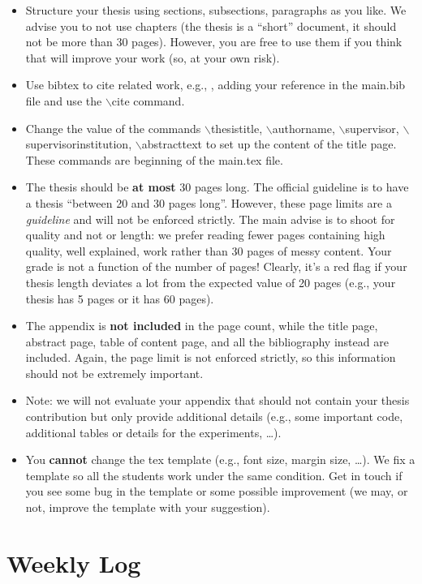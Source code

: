 \documentclass[oneside, a4paper, onecolumn, 11pt]{article}
\begin{document}
\begin{itemize}
\item Structure your thesis using sections, subsections, paragraphs as you like. We advise you to not use chapters (the thesis is a ``short'' document, it should not be more than 30 pages). However, you are free to use them if you think that will improve your work (so, at your own risk).
%
\item Use bibtex to cite related work, e.g., \cite{DBLP:journals/x/Turing37}, adding your reference in the {main.bib} file and use the {$\backslash$cite} command. 
%
\item Change the value of the commands {$\backslash$thesistitle}, {$\backslash$authorname}, {$\backslash$supervisor}, {$\backslash$supervisorinstitution}, {$\backslash$abstracttext} to set up the content of the title page. These commands are beginning of the {main.tex} file.
%
\item The thesis should be \textbf{at most} 30 pages long. The official guideline is to have a thesis ``between 20 and 30 pages long''. However, these page limits are a \emph{guideline} and will not be enforced strictly. 
%
The main advise is to shoot for quality and not or length: we prefer reading fewer pages containing high quality, well explained, work rather than 30 pages of messy content. Your grade is not a function of the number of pages!
%
Clearly, it's a red flag if your thesis length deviates a lot from the expected value of 20 pages (e.g., your thesis has 5 pages or it has 60 pages).
%
\item The appendix is \textbf{not included} in the page count, while the title page, abstract page, table of content page, and all the bibliography instead are included. Again, the page limit is not enforced strictly, so this information should not be extremely important.
%
\item Note: we will not evaluate your appendix that should not contain your thesis contribution but only provide additional details (e.g., some important code, additional tables or details for the experiments, \ldots).
%
\item You \textbf{cannot} change the tex template (e.g., font size, margin size, \ldots). We fix a template so all the students work under the same condition. Get in touch if you see some bug in the template or some possible improvement (we may, or not, improve the template with your suggestion).
% 
\end{itemize}

\section{Weekly Log}
\end{document}
